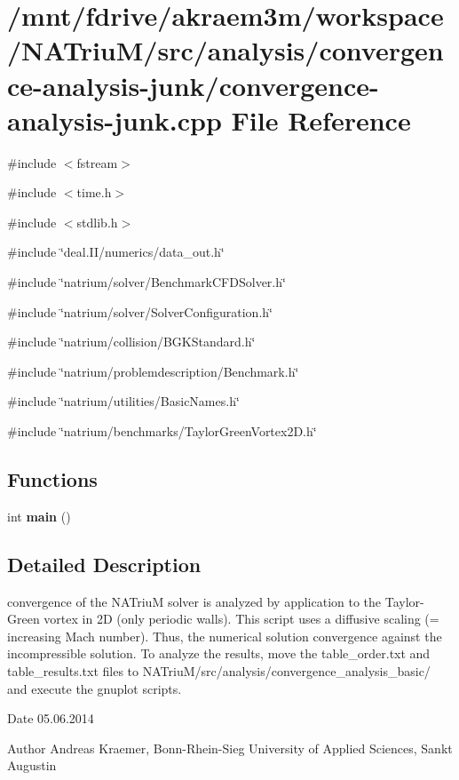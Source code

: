 \hypertarget{convergence-analysis-junk_8cpp}{
\section{/mnt/fdrive/akraem3m/workspace/NATriuM/src/analysis/convergence-\/analysis-\/junk/convergence-\/analysis-\/junk.cpp File Reference}
\label{convergence-analysis-junk_8cpp}
}
{\ttfamily \#include $<$fstream$>$}\par
{\ttfamily \#include $<$time.h$>$}\par
{\ttfamily \#include $<$stdlib.h$>$}\par
{\ttfamily \#include \char`\"{}deal.II/numerics/data\_\-out.h\char`\"{}}\par
{\ttfamily \#include \char`\"{}natrium/solver/BenchmarkCFDSolver.h\char`\"{}}\par
{\ttfamily \#include \char`\"{}natrium/solver/SolverConfiguration.h\char`\"{}}\par
{\ttfamily \#include \char`\"{}natrium/collision/BGKStandard.h\char`\"{}}\par
{\ttfamily \#include \char`\"{}natrium/problemdescription/Benchmark.h\char`\"{}}\par
{\ttfamily \#include \char`\"{}natrium/utilities/BasicNames.h\char`\"{}}\par
{\ttfamily \#include \char`\"{}natrium/benchmarks/TaylorGreenVortex2D.h\char`\"{}}\par
\subsection*{Functions}
\begin{DoxyCompactItemize}
\item 
\hypertarget{convergence-analysis-junk_8cpp_ae66f6b31b5ad750f1fe042a706a4e3d4}{
int {\bfseries main} ()}
\label{convergence-analysis-junk_8cpp_ae66f6b31b5ad750f1fe042a706a4e3d4}

\end{DoxyCompactItemize}


\subsection{Detailed Description}
convergence of the NATriuM solver is analyzed by application to the Taylor-\/Green vortex in 2D (only periodic walls). This script uses a diffusive scaling (= increasing Mach number). Thus, the numerical solution convergence against the incompressible solution. To analyze the results, move the table\_\-order.txt and table\_\-results.txt files to NATriuM/src/analysis/convergence\_\-analysis\_\-basic/ and execute the gnuplot scripts. \begin{DoxyDate}{Date}
05.06.2014 
\end{DoxyDate}
\begin{DoxyAuthor}{Author}
Andreas Kraemer, Bonn-\/Rhein-\/Sieg University of Applied Sciences, Sankt Augustin 
\end{DoxyAuthor}
